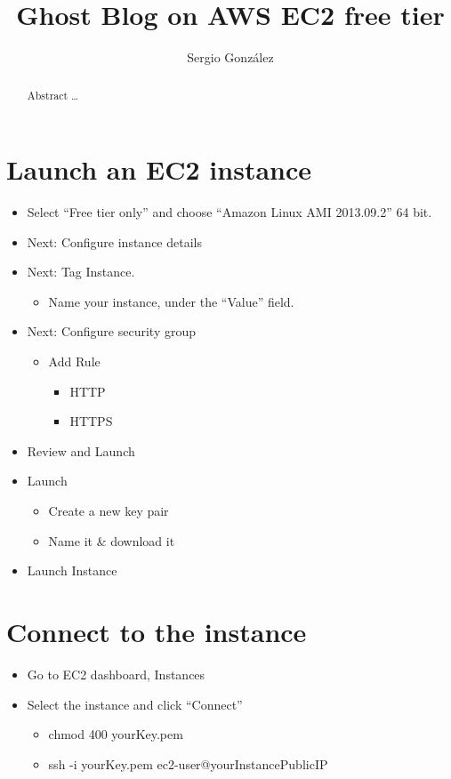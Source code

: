 \documentclass[a4paper]{report}
\title{Ghost Blog on AWS EC2 free tier}
\date{} %
\author{Sergio Gonz\'alez}
\begin{document}
  \maketitle

  \begin{abstract}
    Abstract \ldots
  \end{abstract}

  \tableofcontents

  \section{Launch an EC2 instance}
    \begin{itemize}
      \item Select ``Free tier only'' and choose ``Amazon Linux AMI 2013.09.2'' 64 bit.
      \item Next: Configure instance details
      \item Next: Tag Instance.
        \begin{itemize}
          \item Name your instance, under the ``Value'' field.
        \end{itemize}
      \item Next: Configure security group
        \begin{itemize}
          \item Add Rule
          \begin{itemize}
            \item HTTP
            \item HTTPS
          \end{itemize}
        \end{itemize}
      \item Review and Launch
      \item Launch
        \begin{itemize}
          \item Create a new key pair
          \item Name it \& download it
        \end{itemize}
      \item Launch Instance
    \end{itemize}

  \section{Connect to the instance}
    \begin{itemize}
      \item Go to EC2 dashboard, Instances
      \item Select the instance and click ``Connect''
        \begin{itemize}
          \item chmod 400 yourKey.pem
          \item ssh -i yourKey.pem ec2-user@yourInstancePublicIP
        \end{itemize}
    \end{itemize}
\end{document}
